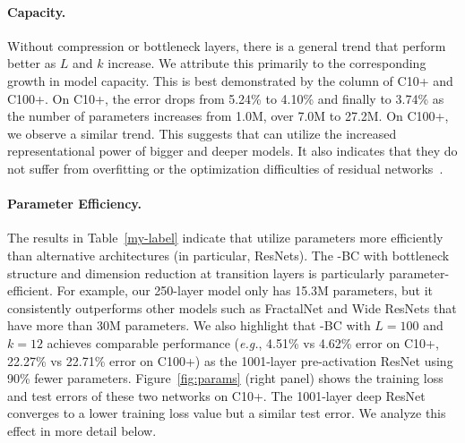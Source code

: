 \paragraph{Capacity.} Without compression or bottleneck layers, there is a general trend that \methodnameshorts{}  perform better as $L$ and $k$ increase. We attribute this primarily to the corresponding growth in model capacity. This is best demonstrated by the column of C10+ and C100+. On C10+,  the error drops from 5.24\% to 4.10\% and finally to 3.74\% as the number of parameters increases from 1.0M, over 7.0M to 27.2M. On C100+, we observe a similar trend. This suggests that \methodnameshorts{} can utilize the increased representational power of bigger and deeper models. It also indicates that they do not suffer from overfitting or the optimization difficulties of residual networks~\cite{resnet}.


\vspace{-2 ex}
\paragraph{Parameter Efficiency.}
The results in Table~\ref{my-label} indicate that \methodnameshorts{} utilize parameters more efficiently than alternative architectures (in particular, ResNets). The \methodnameshort{}-BC with bottleneck structure and dimension reduction at transition layers is particularly parameter-efficient. For example, our 250-layer model only has 15.3M parameters, but it consistently outperforms other models such as FractalNet and Wide ResNets that have more than 30M parameters. We also highlight that \methodnameshort{}-BC with $L\!=\!100$ and $k\!=\!12$ achieves comparable performance  (\emph{e.g.}, 4.51\% vs 4.62\% error on C10+, 22.27\% vs 22.71\% error on C100+) as the 1001-layer pre-activation ResNet using 90\% fewer parameters.
Figure~\ref{fig:params} (right panel) shows the training loss and test errors of these two networks on C10+. The 1001-layer deep ResNet converges to a lower training loss value but a similar test error. We analyze this effect in more detail below.


\vspace{-2 ex}
